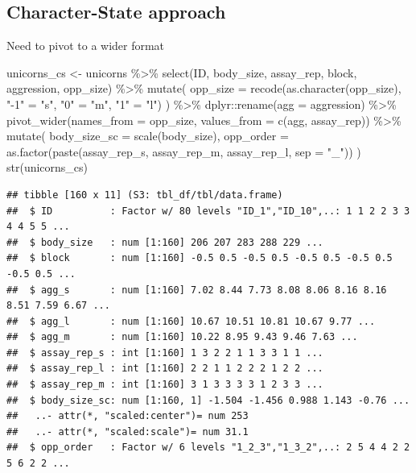 \documentclass[
  12pt,
]{book}
\newenvironment{Shaded}{\begin{snugshade}}{\end{snugshade}}
\newcommand{\AttributeTok}[1]{\textcolor[rgb]{0.77,0.63,0.00}{#1}}
\newcommand{\FunctionTok}[1]{\textcolor[rgb]{0.00,0.00,0.00}{#1}}
\newcommand{\NormalTok}[1]{#1}
\newcommand{\OtherTok}[1]{\textcolor[rgb]{0.56,0.35,0.01}{#1}}
\newcommand{\SpecialCharTok}[1]{\textcolor[rgb]{0.00,0.00,0.00}{#1}}
\newcommand{\StringTok}[1]{\textcolor[rgb]{0.31,0.60,0.02}{#1}}
\begin{document}
\hypertarget{character-state-approach}{%
\subsection{Character-State approach}\label{character-state-approach}}

Need to pivot to a wider format

\begin{Shaded}
\begin{Highlighting}[]
\NormalTok{unicorns\_cs }\OtherTok{\textless{}{-}}\NormalTok{ unicorns }\SpecialCharTok{\%\textgreater{}\%}
  \FunctionTok{select}\NormalTok{(ID, body\_size, assay\_rep, block, aggression, opp\_size) }\SpecialCharTok{\%\textgreater{}\%}
  \FunctionTok{mutate}\NormalTok{(}
    \AttributeTok{opp\_size =} \FunctionTok{recode}\NormalTok{(}\FunctionTok{as.character}\NormalTok{(opp\_size), }\StringTok{"{-}1"} \OtherTok{=} \StringTok{"s"}\NormalTok{, }\StringTok{"0"} \OtherTok{=} \StringTok{"m"}\NormalTok{, }\StringTok{"1"} \OtherTok{=} \StringTok{"l"}\NormalTok{)}
\NormalTok{  ) }\SpecialCharTok{\%\textgreater{}\%}
\NormalTok{  dplyr}\SpecialCharTok{::}\FunctionTok{rename}\NormalTok{(}\AttributeTok{agg =}\NormalTok{ aggression) }\SpecialCharTok{\%\textgreater{}\%}
  \FunctionTok{pivot\_wider}\NormalTok{(}\AttributeTok{names\_from =}\NormalTok{ opp\_size, }\AttributeTok{values\_from =} \FunctionTok{c}\NormalTok{(agg, assay\_rep)) }\SpecialCharTok{\%\textgreater{}\%}
  \FunctionTok{mutate}\NormalTok{(}
    \AttributeTok{body\_size\_sc =} \FunctionTok{scale}\NormalTok{(body\_size),}
    \AttributeTok{opp\_order =} \FunctionTok{as.factor}\NormalTok{(}\FunctionTok{paste}\NormalTok{(assay\_rep\_s, assay\_rep\_m, assay\_rep\_l, }\AttributeTok{sep =} \StringTok{"\_"}\NormalTok{))}
\NormalTok{  )}
\FunctionTok{str}\NormalTok{(unicorns\_cs)}
\end{Highlighting}
\end{Shaded}

\begin{verbatim}
## tibble [160 x 11] (S3: tbl_df/tbl/data.frame)
##  $ ID          : Factor w/ 80 levels "ID_1","ID_10",..: 1 1 2 2 3 3 4 4 5 5 ...
##  $ body_size   : num [1:160] 206 207 283 288 229 ...
##  $ block       : num [1:160] -0.5 0.5 -0.5 0.5 -0.5 0.5 -0.5 0.5 -0.5 0.5 ...
##  $ agg_s       : num [1:160] 7.02 8.44 7.73 8.08 8.06 8.16 8.16 8.51 7.59 6.67 ...
##  $ agg_l       : num [1:160] 10.67 10.51 10.81 10.67 9.77 ...
##  $ agg_m       : num [1:160] 10.22 8.95 9.43 9.46 7.63 ...
##  $ assay_rep_s : int [1:160] 1 3 2 2 1 1 3 3 1 1 ...
##  $ assay_rep_l : int [1:160] 2 2 1 1 2 2 2 1 2 2 ...
##  $ assay_rep_m : int [1:160] 3 1 3 3 3 3 1 2 3 3 ...
##  $ body_size_sc: num [1:160, 1] -1.504 -1.456 0.988 1.143 -0.76 ...
##   ..- attr(*, "scaled:center")= num 253
##   ..- attr(*, "scaled:scale")= num 31.1
##  $ opp_order   : Factor w/ 6 levels "1_2_3","1_3_2",..: 2 5 4 4 2 2 5 6 2 2 ...
\end{verbatim}
\end{document}
